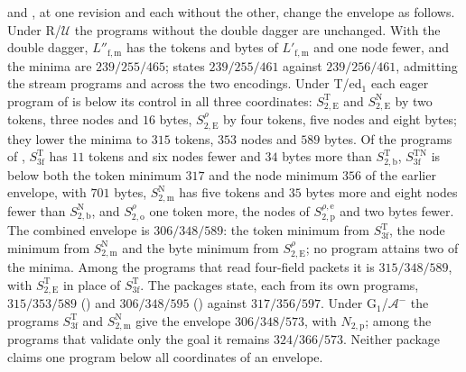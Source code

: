  and , at one revision and each
without the other, change the envelope as follows. Under R/$\mathcal U$ the programs
without the double dagger are unchanged. With the double dagger,
$L''_{\mathrm{f,m}}$ has the tokens and bytes of $L'_{\mathrm{f,m}}$ and one node fewer,
and the minima are $239/255/465$;  states $239/255/461$
against $239/256/461$, admitting the stream programs and across the two encodings.
Under T/ed$_1$ each eager program of  is below its control in
all three coordinates: $S^{\mathrm T}_{2,\mathrm E}$ and $S^{\mathrm N}_{2,\mathrm E}$
by two tokens, three nodes and $16$ bytes, $S^{\rho}_{2,\mathrm E}$ by four tokens,
five nodes and eight bytes; they lower the minima to $315$ tokens, $353$ nodes and
$589$ bytes. Of the programs of ,
$S^{\mathrm T}_{3\mathrm f}$ has $11$ tokens and six nodes fewer and $34$ bytes more
than $S^{\mathrm T}_{2,\mathrm b}$, $S^{\mathrm{TN}}_{3\mathrm f}$ is below both the
token minimum $317$ and the node minimum $356$ of the earlier envelope, with $701$
bytes, $S^{\mathrm N}_{2,\mathrm m}$ has five tokens and $35$ bytes more and eight
nodes fewer than $S^{\mathrm N}_{2,\mathrm b}$, and $S^{\rho}_{2,\mathrm o}$ one token
more, the nodes of $S^{\rho,\mathrm e}_{2,\mathrm p}$ and two bytes fewer. The combined
envelope is $306/348/589$: the token minimum from $S^{\mathrm T}_{3\mathrm f}$, the node
minimum from $S^{\mathrm N}_{2,\mathrm m}$ and the byte minimum from
$S^{\rho}_{2,\mathrm E}$; no program attains two of the minima. Among the programs
that read four-field packets it is $315/348/589$, with $S^{\mathrm T}_{2,\mathrm E}$ in
place of $S^{\mathrm T}_{3\mathrm f}$. The packages state, each from its own programs,
$315/353/589$ () and $306/348/595$
() against $317/356/597$. Under G$_1$/$\mathcal A^{-}$ the
programs $S^{\mathrm T}_{3\mathrm f}$ and $S^{\mathrm N}_{2,\mathrm m}$ give the envelope
$306/348/573$, with $N_{2,\mathrm p}$; among the programs that validate only the goal
it remains $324/366/573$. Neither package claims one program below all coordinates of
an envelope.


